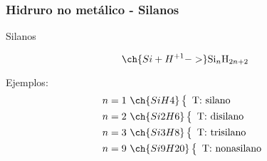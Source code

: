 \subsubsection*{Hidruro no metálico - Silanos}
\begin{Theorem*} {Silanos}
	\begin{figure}[H]
		\centering
	\end{figure}
	$$\ch{Si + H^{+1} ->}\mathrm{Si}_n\mathrm{H}_{2n+2}$$
\end{Theorem*}
\noindent Ejemplos:
\begin{align*}
	&n=1 \ \ch{SiH4}\left\{\begin{array}{l}
		\text{T: silano}
	\end{array}\right. \\
	&n=2 \ \ch{Si2H6}\left\{\begin{array}{l}
		\text{T: disilano}
	\end{array}\right. \\
	&n=3 \ \ch{Si3H8}\left\{\begin{array}{l}
		\text{T: trisilano}
	\end{array}\right. \\
	&n=9 \ \ch{Si9H20}\left\{\begin{array}{l}
		\text{T: nonasilano}
	\end{array}\right.
\end{align*}
